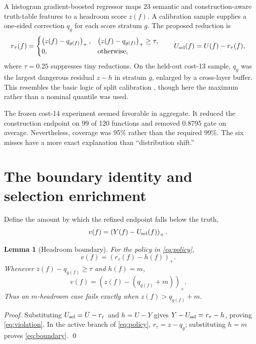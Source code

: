 \documentclass[11pt]{article}
\newtheorem{lemma}[proposition]{Lemma}
\newcommand{\pos}[1]{\left(#1\right)_+}
\begin{document}
A histogram gradient-boosted regressor \cite{friedman2001} maps 23 semantic
and construction-aware truth-table features to a headroom score $z(f)$.  A
calibration sample supplies a one-sided correction $q_g$ for each score
stratum $g$.  The proposed reduction is
\begin{equation}
 r_\tau(f)=
 \begin{cases}
   \pos{z(f)-q_{g(f)}},&\pos{z(f)-q_{g(f)}}\ge\tau,\\
   0,&\text{otherwise},
 \end{cases}
 \qquad U_{\rm sel}(f)=U(f)-r_\tau(f),                 \label{eq:policy}
\end{equation}
where $\tau=0.25$ suppresses tiny reductions.  On the held-out cost-13 sample,
$q_g$ was the largest dangerous residual $z-h$ in stratum $g$, enlarged by a
cross-layer buffer.  This resembles the basic logic of split calibration
\cite{vovk2005,lei2018}, though here the maximum rather than a nominal
quantile was used.

The frozen cost-14 experiment seemed favorable in aggregate.  It reduced the
construction endpoint on 99 of 120 functions and removed 0.8795 gate on
average.  Nevertheless, coverage was 95\% rather than the required 99\%.
The six misses have a more exact explanation than ``distribution shift.''

\section{The boundary identity and selection enrichment}

Define the amount by which the refined endpoint falls below the truth,
\[
 v(f)=\pos{Y(f)-U_{\rm sel}(f)}.
\]

\begin{lemma}[Headroom boundary]
For the policy in \eqref{eq:policy},
\begin{equation}
 v(f)=\pos{r_\tau(f)-h(f)}.                              \label{eq:violation}
\end{equation}
Whenever $z(f)-q_{g(f)}\ge\tau$ and $h(f)=m$,
\begin{equation}
 v(f)=\pos{z(f)-(q_{g(f)}+m)}.                           \label{eq:boundary}
\end{equation}
Thus an $m$-headroom case fails exactly when $z(f)>q_{g(f)}+m$.
\end{lemma}

\emph{Proof.} Substituting $U_{\rm sel}=U-r_\tau$ and $h=U-Y$ gives
$Y-U_{\rm sel}=r_\tau-h$, proving \eqref{eq:violation}.  In the active branch
of \eqref{eq:policy}, $r_\tau=z-q_g$; substituting $h=m$ proves
\eqref{eq:boundary}. \qed
\end{document}
